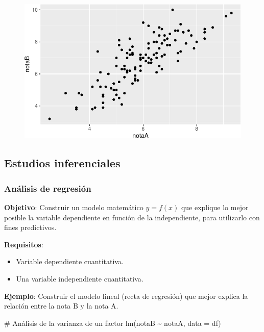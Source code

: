 \documentclass[
  a4paper,
]{scrreport}
\newenvironment{Shaded}{\begin{snugshade}}{\end{snugshade}}
\newcommand{\AttributeTok}[1]{\textcolor[rgb]{0.40,0.45,0.13}{#1}}
\newcommand{\CommentTok}[1]{\textcolor[rgb]{0.37,0.37,0.37}{#1}}
\newcommand{\FunctionTok}[1]{\textcolor[rgb]{0.28,0.35,0.67}{#1}}
\newcommand{\NormalTok}[1]{\textcolor[rgb]{0.00,0.23,0.31}{#1}}
\newcommand{\SpecialCharTok}[1]{\textcolor[rgb]{0.37,0.37,0.37}{#1}}
\providecommand{\tightlist}{%
  \setlength{\itemsep}{0pt}\setlength{\parskip}{0pt}}\usepackage{longtable,booktabs,array}
\theoremstyle{definition}
\theoremstyle{definition}
\theoremstyle{remark}
\begin{document}
\begin{figure}[H]

{\centering \includegraphics{08-analisis-estadisticos_files/figure-pdf/unnamed-chunk-59-1.pdf}

}

\end{figure}

\hypertarget{estudios-inferenciales-5}{%
\subsection{Estudios inferenciales}\label{estudios-inferenciales-5}}

\hypertarget{anuxe1lisis-de-regresiuxf3n}{%
\subsubsection{Análisis de
regresión}\label{anuxe1lisis-de-regresiuxf3n}}

\textbf{Objetivo}: Construir un modelo matemático \(y=f(x)\) que
explique lo mejor posible la variable dependiente en función de la
independiente, para utilizarlo con fines predictivos.

\textbf{Requisitos}:

\begin{itemize}
\tightlist
\item
  Variable dependiente cuantitativa.
\item
  Una variable independiente cuantitativa.
\end{itemize}

\textbf{Ejemplo}: Construir el modelo lineal (recta de regresión) que
mejor explica la relación entre la nota B y la nota A.

\begin{Shaded}
\begin{Highlighting}[]
\CommentTok{\# Análisis de la varianza de un factor}
\FunctionTok{lm}\NormalTok{(notaB }\SpecialCharTok{\textasciitilde{}}\NormalTok{ notaA, }\AttributeTok{data =}\NormalTok{ df)}
\end{Highlighting}
\end{Shaded}
\end{document}
